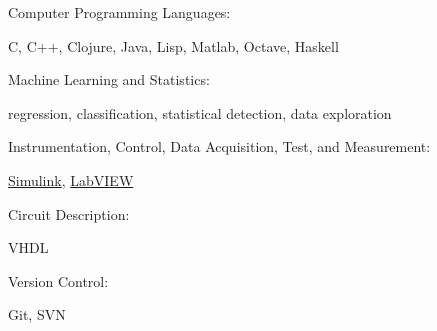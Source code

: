 \documentclass[10pt]{article}
\newcommand{\halfblankline}{\quad\vspace{-0.5\baselineskip}\pagebreak[3]}
\providecommand\Matlab{\textsc{Matlab}}
\begin{document}
Computer Programming Languages:
%
\begin{innerlist}
    \item C, C$+$$+$,  Clojure, Java, Lisp, Matlab, Octave, Haskell
\end{innerlist}

\halfblankline

Machine Learning and Statistics:
\begin{innerlist}
    \item regression, classification, statistical detection, data exploration
\end{innerlist}

\halfblankline

Instrumentation, Control, Data Acquisition, Test, and Measurement:
%
\begin{innerlist}
    \item 
        \href{http://www.mathworks.com/products/simulink/}{Simulink},
        \href{http://www.ni.com/}{LabVIEW}
\end{innerlist}

\halfblankline

Circuit Description:
\begin{innerlist}
    \item VHDL
\end{innerlist}

Version Control:
%
\begin{innerlist}
    \item Git, SVN
\end{innerlist}

\halfblankline

% 
% 
% 
% 
% 
% 
\end{document}
